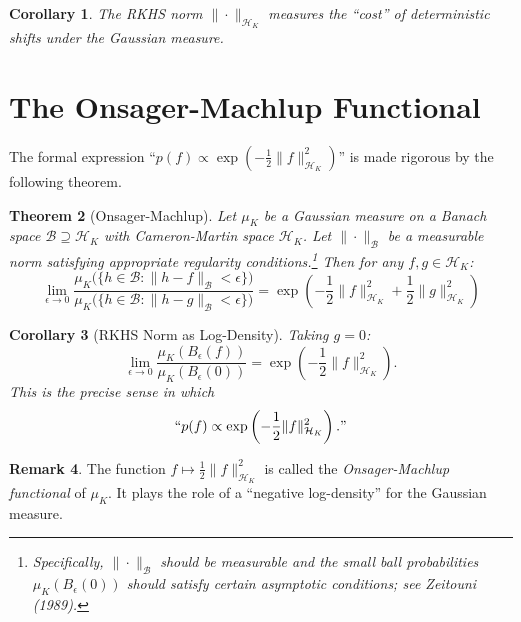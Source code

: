 \documentclass[11pt]{article}
\newtheorem{theorem}{Theorem}[section]
\newtheorem{corollary}[theorem]{Corollary}
\theoremstyle{definition}
\newtheorem{remark}[theorem]{Remark}
\newcommand{\HK}{\mathcal{H}_K}
\newcommand{\B}{\mathcal{B}}
\newcommand{\norm}[1]{\| #1 \|}
\begin{document}
\begin{corollary}
The RKHS norm $\norm{\cdot}_{\HK}$ measures the ``cost'' of deterministic shifts under the Gaussian measure.
\end{corollary}

\section{The Onsager-Machlup Functional}

The formal expression ``$p(f) \propto \exp(-\frac{1}{2}\norm{f}_{\HK}^2)$'' is made rigorous by the following theorem.

\begin{theorem}[Onsager-Machlup]
\label{thm:onsager-machlup}
Let $\mu_K$ be a Gaussian measure on a Banach space $\B \supseteq \HK$ with Cameron-Martin space $\HK$. Let $\norm{\cdot}_{\B}$ be a measurable norm satisfying appropriate regularity conditions.\footnote{Specifically, $\norm{\cdot}_{\B}$ should be measurable and the small ball probabilities $\mu_K(B_\epsilon(0))$ should satisfy certain asymptotic conditions; see Zeitouni (1989).} Then for any $f, g \in \HK$:
\begin{equation}
    \boxed{
    \lim_{\epsilon \to 0} \frac{\mu_K\bigl(\{h \in \B : \norm{h - f}_{\B} < \epsilon\}\bigr)}{\mu_K\bigl(\{h \in \B : \norm{h - g}_{\B} < \epsilon\}\bigr)} = \exp\left( -\frac{1}{2}\norm{f}_{\HK}^2 + \frac{1}{2}\norm{g}_{\HK}^2 \right)
    }
\end{equation}
\end{theorem}

\begin{corollary}[RKHS Norm as Log-Density]
Taking $g = 0$:
\begin{equation}
    \lim_{\epsilon \to 0} \frac{\mu_K(B_\epsilon(f))}{\mu_K(B_\epsilon(0))} = \exp\left( -\frac{1}{2}\norm{f}_{\HK}^2 \right).
\end{equation}
This is the precise sense in which
\begin{equation}
    ``p(f) \propto \exp\left(-\frac{1}{2}\norm{f}_{\HK}^2\right)."
\end{equation}
\end{corollary}

\begin{remark}
The function $f \mapsto \frac{1}{2}\norm{f}_{\HK}^2$ is called the \emph{Onsager-Machlup functional} of $\mu_K$. It plays the role of a ``negative log-density'' for the Gaussian measure.
\end{remark}
\end{document}
